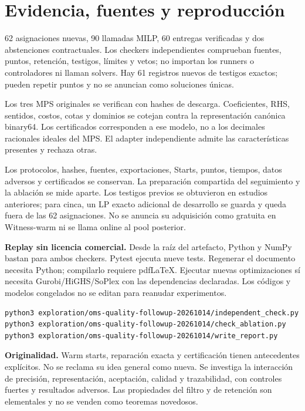 \documentclass[10pt,a4paper]{article}
\begin{document}
\section*{Evidencia, fuentes y reproducción}
62 asignaciones nuevas, 90 llamadas MILP, 60 entregas verificadas y dos
abstenciones contractuales. Los checkers independientes comprueban fuentes,
puntos, retención, testigos, límites y vetos; no importan los runners o
controladores ni llaman solvers. Hay 61 registros nuevos de testigos exactos;
pueden repetir puntos y no se anuncian como soluciones únicas.

Los tres MPS originales se verifican con hashes de descarga. Coeficientes,
RHS, sentidos, costos, cotas y dominios se cotejan contra la representación
canónica binary64. Los certificados corresponden a ese modelo, no a los
decimales racionales ideales del MPS. El adapter independiente admite las
características presentes y rechaza otras.

Los protocolos, hashes, fuentes, exportaciones, Starts, puntos, tiempos,
datos adversos y certificados se conservan. La preparación compartida del
seguimiento y la ablación se mide aparte. Los testigos previos se obtuvieron
en estudios anteriores; para cinca, un LP exacto adicional de desarrollo
se guarda y queda fuera de las 62 asignaciones. No se anuncia su adquisición
como gratuita en Witness-warm ni se llama online al pool posterior.

\textbf{Replay sin licencia comercial.} Desde la raíz del artefacto, Python
y NumPy bastan para ambos checkers. Pytest ejecuta nueve tests. Regenerar
el documento necesita Python; compilarlo requiere pdfLaTeX. Ejecutar nuevas
optimizaciones sí necesita Gurobi/HiGHS/SoPlex con las dependencias declaradas.
Los códigos y modelos congelados no se editan para reanudar experimentos.
\begin{verbatim}
python3 exploration/oms-quality-followup-20261014/independent_check.py
python3 exploration/oms-quality-followup-20261014/check_ablation.py
python3 exploration/oms-quality-followup-20261014/write_report.py
\end{verbatim}
\textbf{Originalidad.} Warm starts, reparación exacta y certificación tienen
antecedentes explícitos. No se reclama su idea general como nueva. Se investiga
la interacción de precisión, representación, aceptación, calidad y trazabilidad,
con controles fuertes y resultados adversos. Las propiedades del filtro y de
retención son elementales y no se venden como teoremas novedosos.
\end{document}
